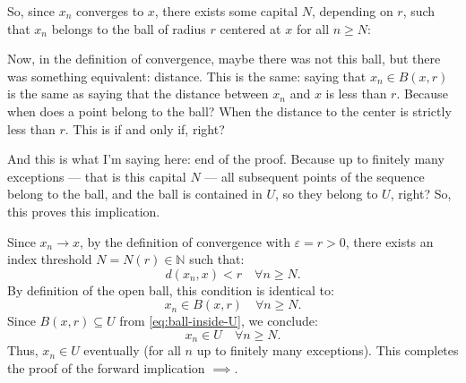 \begin{proofWrapper}
\begin{speech}[00:45:06 - 00:46:58]
So, since $x_n$ converges to $x$, there exists some capital $N$, depending on $r$, such that  $x_n$ belongs to the ball of radius $r$ centered at $x$ for all $n \ge N$: 

Now, in the definition of convergence, maybe there was not this ball, but there was something equivalent: distance. This is the same: saying that $x_n \in B(x, r)$ is the same as saying that the distance between $x_n$ and $x$ is less than $r$.  Because when does a point belong to the ball? When the distance to the center is strictly less than $r$. This is if and only if, right?

And this is what I'm saying here: end of the proof.  Because up to finitely many exceptions --- that is this capital $N$ --- all subsequent points of the sequence belong to the ball, and the ball is contained in $U$, so they belong to $U$, right? So, this proves this implication.
\end{speech}

\begin{content}
Since $x_n \to x$, by the definition of convergence with $\varepsilon = r > 0$, there exists an index threshold $N = N(r) \in \mathbb{N}$ such that:
\begin{equation}\label{eq:convergence-radius-r}
d(x_n, x) < r \quad \forall n \ge N.
\end{equation}
By definition of the open ball, this condition is identical to:
\begin{equation}\label{eq:points-in-ball}
x_n \in B(x, r) \quad \forall n \ge N.
\end{equation}
Since $B(x, r) \subseteq U$ from \eqref{eq:ball-inside-U}, we conclude:
\[
x_n \in U \quad \forall n \ge N.
\]
Thus, $x_n \in U$ eventually (for all $n$ up to finitely many exceptions). This completes the proof of the forward implication $\implies$.
\end{content}

\begin{hidden}
\end{hidden}


\end{proofWrapper}
